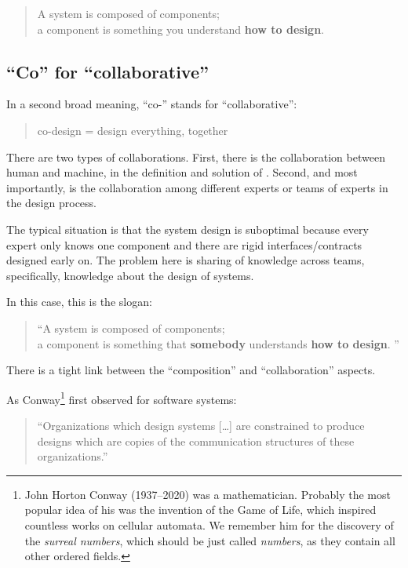 \begin{quote}
    A system is composed of components;\\
    a component is something you understand
    \textbf{how to design}.
\end{quote}

\subsection{``Co'' for ``collaborative''}

In a second broad meaning, ``co-'' stands for ``collaborative'':

\begin{quote}
    co-design = design everything, together
\end{quote}

There are two types of collaborations.
First, there is the collaboration between human and machine, in the definition and solution of .
Second, and most importantly, is the collaboration among different experts or teams of experts in the design process.

The typical situation is that the system design is suboptimal because every expert only knows one component and there are rigid interfaces/contracts designed early on.
The problem here is sharing of knowledge across teams, specifically, knowledge about the design of systems.

In this case, this is the slogan:

\begin{quote}
    \enquote{A system is composed of components;\\
        a component is something that \textbf{somebody} understands
        \textbf{how to design}.
    }
\end{quote}

There is a tight link between the ``composition'' and ``collaboration'' aspects.

As Conway\footnote{John Horton Conway (1937--2020) was a mathematician.
    Probably the most popular idea of his was the invention of the Game of Life, which inspired countless works on cellular automata.
    We remember him for the discovery of the \emph{surreal numbers}, which should be just called \emph{numbers}, as they contain all other ordered fields.
} first observed for software systems:

\begin{quote}
    \enquote{Organizations which design systems [\dots] are constrained to produce designs which are copies of the communication structures of these organizations.}
\end{quote}

